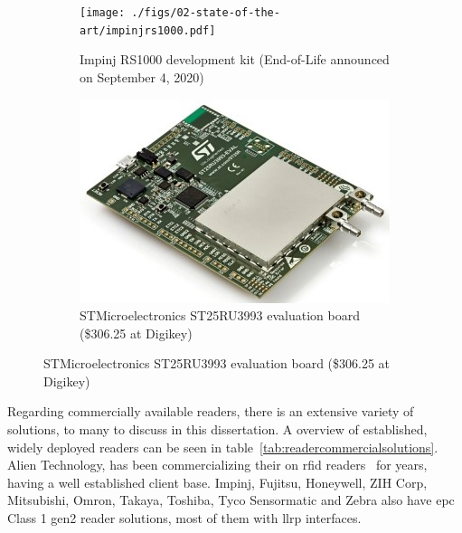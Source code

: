\begin{figure}[H]
    \centering
    \begin{subfigure}{.35\textwidth}
        \centering
        \texttt{[image: ./figs/02-state-of-the-art/impinjrs1000.pdf]}
        \caption{Impinj RS1000 development kit (End-of-Life announced on September 4, 2020)} 
        \label{fig:impinjrs1000}
    \end{subfigure}
    \begin{subfigure}{.55\textwidth}
        \centering
        \includegraphics[width=\linewidth]{./figs/02-state-of-the-art/st25ru3993-eval.jpg}
        \caption{STMicroelectronics ST25RU3993 evaluation board (\$306.25 at Digikey)} 
        \label{fig:st25ru3993}
    \end{subfigure}
    \label{fig:devboards}
\end{figure}

Regarding commercially available readers, there is an extensive variety of solutions, to many to discuss in this dissertation. A overview of established, widely deployed readers can be seen in table~\ref{tab:readercommercialsolutions}.
Alien Technology, has been commercializing their on \ac{rfid} readers~\cite{AlienTechnologyReaders} for years, having a well established client base. Impinj, Fujitsu, Honeywell, ZIH Corp, Mitsubishi, Omron, Takaya, Toshiba, Tyco Sensormatic and Zebra also have \ac{epc} Class 1 \ac{gen2} reader solutions, most of them with \ac{llrp} interfaces.

